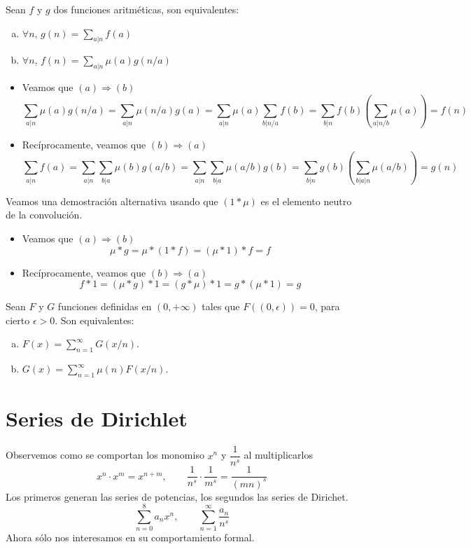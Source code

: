 \documentclass[TAN.tex]{subfiles}
\begin{document}
\begin{prop}
Sean $f$ y $g$ dos funciones aritméticas, son equivalentes:
\begin{enumerate}[(a)]
	\item $\forall n$, $g(n) = \sum_{a|n} f(a)$
	\item $\forall n$, $f(n) = \sum_{a|n}μ(a) g(n/a)$
\end{enumerate}
\end{prop}
\newpage
\begin{dem}\mbox{}
\begin{itemize}
	\item Veamos que $(a) \Rightarrow (b)$
	\[
	\sum_{a|n} μ(a)g(n/a) = \sum_{a|n}μ(n/a)g(a) = \sum_{a|n}μ(a) \sum_{b|n/a} f(b) = \sum_{b|n}f(b)\left(\sum_{a|n/b} μ(a)\right) = f(n)
	\]
	\item Recíprocamente, veamos que  $(b) \Rightarrow (a)$
	\[
	\sum_{a|n}f(a) = \sum_{a|n} \sum_{b|a} μ(b)g(a/b) = \sum_{a|n}\sum_{b|a} μ(a/b)g(b) = \sum_{b|n}g(b)\left(\sum_{b|a|n}μ(a/b)\right) = g(n)
	\]
\end{itemize}
Veamos una demostración alternativa usando que $(1\ast \mu)$ es el elemento neutro de la convolución.
\begin{itemize}
\item Veamos que $(a) \Rightarrow (b)$
	$$
	\mu \ast g = \mu \ast (1 \ast f) = (\mu \ast 1)\ast f= f
	$$
	\item Recíprocamente, veamos que  $(b) \Rightarrow (a)$
	\[
	f \ast 1 = (\mu \ast g) \ast 1 = (g\ast \mu) \ast 1 = g \ast (\mu \ast 1) = g
	\]
\end{itemize}
\end{dem}

\begin{prop}
Sean $F$ y $G$ funciones definidas en $(0,+∞)$ tales que $F((0,ϵ))=0$, para cierto $ϵ > 0$. Son equivalentes:
\begin{enumerate}[(a)]
\item $F(x) = \sum_{n=1}^{∞} G(x/n)$.
\item $G(x) = \sum_{n=1}^{∞} μ(n) F(x/n)$.
\end{enumerate}
\end{prop}


\section{Series de Dirichlet}

Observemos como se comportan los monomiso $x^n$ y $\dfrac{1}{n^s}$ al multiplicarlos
\[ x^n \cdot x^m = x^{n+m}, \qquad \frac{1}{n^s} \cdot \frac{1}{m^s} = \frac{1}{(mn)^s} \]
Los primeros generan las series de potencias, los segundos las series de Dirichet.
\[ \sum_{n=0}^{8} a_n x^n, \qquad \sum_{n=1}^{∞} \frac{a_n}{n^s} \]
Ahora sólo nos interesamos en su comportamiento formal.
\end{document}
